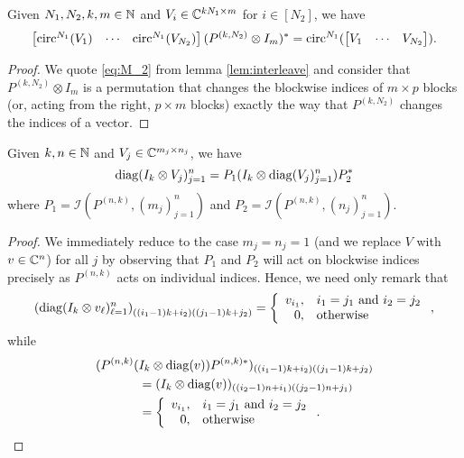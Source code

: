 \begin{lemma}
  Given $N_1, N_2, k, m \in \mathbb{N}$ and $V_i \in \mathbb{C}^{k N_1 \times m}$ for $i \in [N_2]$, we have \[\begin{bmatrix} \operatorname{circ}^{N_1}(V_1) & \cdots & \operatorname{circ}^{N_1}(V_{N_2}) \end{bmatrix} (P^{(k, N_2)} \otimes I_m)^* = \operatorname{circ}^{N_1}(\begin{bmatrix} V_1 & \cdots & V_{N_2}\end{bmatrix}).\] \label{lem:block_circ_right}
\end{lemma}

\begin{proof}
  We quote \eqref{eq:M_2} from lemma \ref{lem:interleave} and consider that $P^{(k, N_2)} \otimes I_m$ is a permutation that changes the blockwise indices of $m \times p$ blocks (or, acting from the right, $p \times m$ blocks) exactly the way that $P^{(k, N_2)}$ changes the indices of a vector.
\end{proof}

\begin{lemma}
  Given $k, n \in \mathbb{N}$ and $V_j \in \mathbb{C}^{m_j \times n_j}$, we have \[\operatorname{diag}(I_k \otimes V_j)_{j = 1}^n =  P_1 (I_k \otimes \operatorname{diag}(V_j)_{j = 1}^n) P_2^*\] where $P_1 = \mathcal{I}(P^{(n, k)}, (m_j)_{j = 1}^n)$ and $P_2 = \mathcal{I}(P^{(n, k)}, (n_j)_{j = 1}^n)$. \label{lem:diag_kron_perm}
\end{lemma}

\begin{proof}
  We immediately reduce to the case $m_j = n_j = 1$ (and we replace $V$ with $v \in \mathbb{C}^n$) for all $j$ by observing that $P_1$ and $P_2$ will act on blockwise indices precisely as $P^{(n, k)}$ acts on individual indices.  Hence, we need only remark that \[\left(\diag(I_k \otimes v_\ell)_{\ell = 1}^n\right)_{((i_1 - 1)k + i_2) ((j_1 - 1)k + j_2)} = \left\{\begin{array}{r@{,\quad}l} v_{i_1} & i_1 = j_1 \ \text{and} \ i_2 = j_2 \\ 0 & \text{otherwise} \end{array}\right.,\] while \begin{align*} (P^{(n, k)} (&I_k \otimes \diag(v)) P^{(n, k)*})_{((i_1 - 1)k + i_2) ((j_1 - 1)k + j_2)} \\ &= (I_k \otimes \diag(v))_{((i_2 - 1)n + i_1) ((j_2 - 1)n + j_1)} \\ &= \left\{\begin{array}{r@{,\quad}l} v_{i_1} & i_1 = j_1 \ \text{and} \ i_2 = j_2 \\ 0 & \text{otherwise} \end{array}\right..\end{align*}
\end{proof}

